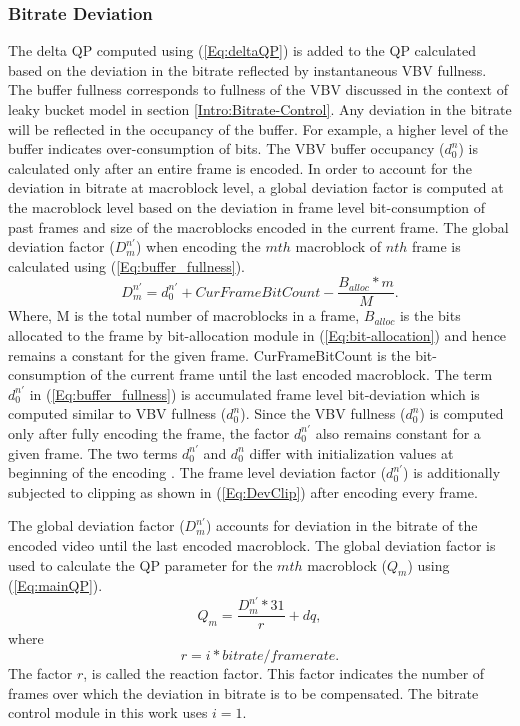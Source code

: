 \documentclass[11pt]{article} %
\begin{document}
\subsubsection{Bitrate Deviation} \label{sec: Bitrate overview: Bitrate deviation}
	The delta QP computed using (\ref{Eq:deltaQP}) is added to the QP calculated based on the deviation in the bitrate reflected by instantaneous VBV fullness. The buffer fullness corresponds to fullness of the VBV discussed in the context of leaky bucket model in section \ref{Intro:Bitrate-Control}. Any deviation in the bitrate will be reflected in the occupancy of the buffer. For example, a higher level of the buffer indicates over-consumption of bits. The VBV buffer occupancy ($d_0^n$) is calculated only after an entire frame is encoded. In order to account for the deviation in bitrate at macroblock level, a global deviation factor is computed at the macroblock level based on the deviation in frame level bit-consumption of past frames and size of the macroblocks encoded in the current frame. The global deviation factor ($D_m^{n'}$) when encoding the $mth$ macroblock of $nth$ frame is calculated using (\ref{Eq:buffer_fullness}).
\begin{equation}
	\label{Eq:buffer_fullness}
	D_m^{n'} = d_0^{n'} + CurFrameBitCount - \frac{B_{alloc} * m}{M}.
\end{equation}
Where, M is the total number of macroblocks in a frame, $B_{alloc}$ is the bits allocated to the frame by bit-allocation module in (\ref{Eq:bit-allocation}) and hence remains a constant for the given frame. CurFrameBitCount is the bit-consumption of the current frame until the last encoded macroblock. The term $d_0^{n'}$ in (\ref{Eq:buffer_fullness}) is accumulated frame level bit-deviation which is computed similar to VBV fullness ($d_0^n$). Since the VBV fullness ($d_0^n$) is computed only after fully encoding the frame, the factor $d_0^{n'}$ also remains constant for a given frame. The two terms $d_0^{n'}$ and $d_0^n$ differ with initialization values at beginning of the encoding \cite{JVTF086}. The frame level deviation factor ($d_0^{n'}$) is additionally subjected to clipping as shown in (\ref{Eq:DevClip}) after encoding every frame. 

The global deviation factor ($D_m^{n'}$) accounts for deviation in the bitrate of the encoded video until the last encoded macroblock. The global deviation factor is used to calculate the QP parameter for the $mth$ macroblock ($Q_m$) using (\ref{Eq:mainQP}).
\begin{equation}
	\label{Eq:mainQP}
	Q_m = \frac{D_m^{n'} * 31}{r} + dq,
\end{equation}
where
\begin{equation}
 r = i * bitrate/framerate \nonumber.
\end{equation}
The factor $r$, is called the reaction factor. This factor indicates the number of frames over which the deviation in bitrate is to be compensated. The bitrate control module in this work uses $i = 1$.
\end{document}
